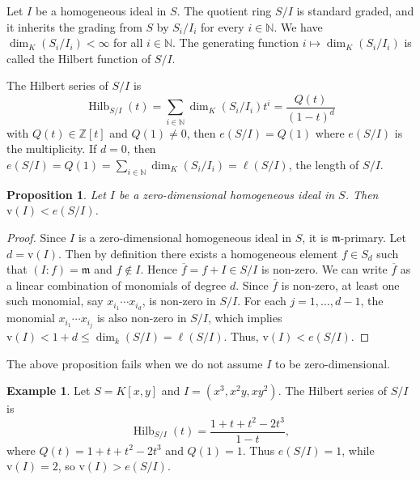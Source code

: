 \documentclass[11pt,reqno,a4paper]{amsart}
\newtheorem{proposition}[theorem]{Proposition}
\theoremstyle{definition}
\newtheorem{example}[theorem]{Example}
\begin{document}
Let $I$ be a homogeneous ideal in $S$. The quotient ring $S/I$ is standard graded, and it inherits the grading from $S$ by $S_i/I_i$ for every $i \in \mathbb{N}$. We have $\dim_K(S_i/I_i) < \infty$ for all $i \in \mathbb{N}$. The generating function $i \mapsto \dim_K(S_i/I_i)$ is called the Hilbert function of $S/I$. 

\noindent The Hilbert series of $S/I$ is
\[\operatorname{Hilb}_{S/I}(t) = \sum_{i \in \mathbb{N}} \dim_K(S_i/I_i) t^i = \frac{Q(t)}{(1-t)^d}\]
with $Q(t) \in \mathbb{Z}[t]$ and $Q(1) \neq 0$, then $e(S/I) = Q(1)$ where $e(S/I)$ is the multiplicity.
If $d = 0$, then $e(S/I) = Q(1) = \sum_{i \in \mathbb{N}} \dim_K(S_i/I_i) = \ell(S/I)$, the length of $S/I$.



\begin{proposition}\label{vNumbervsHilbertMultiplicity}
    Let $I$ be a zero-dimensional homogeneous ideal in $S$. Then $\mathrm{v}(I) < e(S/I)$.
\end{proposition}

\begin{proof}
    Since $I$ is a zero-dimensional homogeneous ideal in $S$, it is $\mathfrak{m}$-primary. Let $d = \mathrm{v}(I)$. Then by definition there exists a homogeneous element $f \in S_d$ such that $(I:f) = \mathfrak{m}$ and $f \notin I$. Hence $\overline{f} = f + I \in S/I$ is non-zero. We can write $\overline{f}$ as a linear combination of monomials of degree $d$. Since $\overline{f}$ is non-zero, at least one such monomial, say $x_{i_1}\cdots x_{i_d}$, is non-zero in $S/I$. For each $j = 1,\ldots,d-1$, the monomial $x_{i_1}\cdots x_{i_j}$ is also non-zero in $S/I$, which implies $\mathrm{v}(I) < 1+d \leq \dim_k(S/I) = \ell(S/I)$. Thus, $\mathrm{v}(I) < e(S/I)$.
\end{proof}

The above proposition fails when we do not assume $I$ to be zero-dimensional. 


\begin{example}
    
Let $S = K[x,y]$ and $I = (x^3, x^2y, xy^2)$. The Hilbert series of $ S/I$ is
\[\operatorname{Hilb}_{S/I}(t) = \frac{1+t+t^2-2t^3}{1-t},\]
where $Q(t) = 1+t+t^2-2t^3$ and $Q(1) = 1$. Thus $e(S/I) = 1$, while $\mathrm{v}(I) = 2$, so $\mathrm{v}(I) > e(S/I)$.\\

\end{example} 
\end{document}
